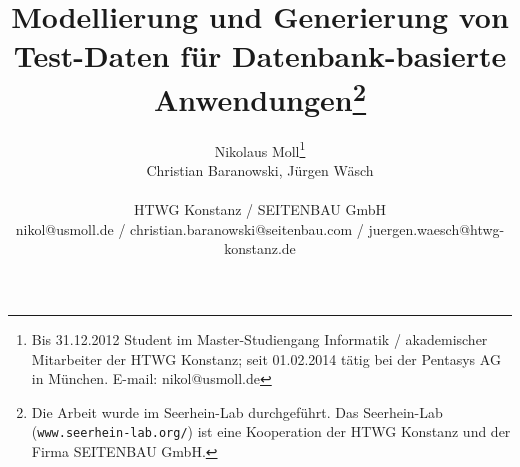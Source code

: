 \documentclass{lni}
\author{
	Nikolaus Moll\footnote{Bis 31.12.2012 Student im Master-Studiengang Informatik / akademischer Mitarbeiter der HTWG Konstanz; seit 01.02.2014 tätig bei der Pentasys AG in München. E-mail: nikol@usmoll.de}\\ Christian Baranowski, Jürgen Wäsch \\ 
	\\ 
	HTWG Konstanz / SEITENBAU GmbH\\ 
           nikol@usmoll.de / christian.baranowski@seitenbau.com / juergen.waesch@htwg-konstanz.de 
}
\title{Modellierung und Generierung von Test-Daten für Datenbank-basierte Anwendungen\footnote{Die Arbeit wurde im Seerhein-Lab durchgeführt. Das Seerhein-Lab  (\texttt{www.seerhein-lab.org/}) ist eine Kooperation der HTWG Konstanz und der Firma SEITENBAU GmbH.}}
\begin{document}
\maketitle




\begin{abstract}

%

\end{abstract}


%

%

%

%




\end{document}
